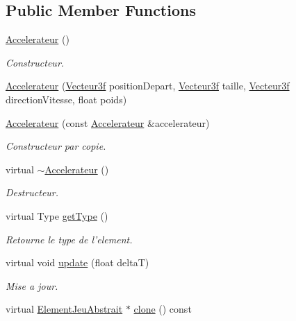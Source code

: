 \subsection*{Public Member Functions}
\begin{DoxyCompactItemize}
\item 
\hyperlink{group__inf2990_gaa9565cdb55e423b975ed39344f2c57a9}{Accelerateur} ()
\begin{DoxyCompactList}\small\item\em Constructeur. \end{DoxyCompactList}\item 
\hyperlink{group__inf2990_ga225372057b8bc81b0488af790df85fae}{Accelerateur} (\hyperlink{group__utilitaire_ga6b2956069f76c7e27df4f79f87e5a48c}{Vecteur3f} position\-Depart, \hyperlink{group__utilitaire_ga6b2956069f76c7e27df4f79f87e5a48c}{Vecteur3f} taille, \hyperlink{group__utilitaire_ga6b2956069f76c7e27df4f79f87e5a48c}{Vecteur3f} direction\-Vitesse, float poids)
\item 
\hyperlink{group__inf2990_gac826e93cf1b9d277f38ca09d52636a43}{Accelerateur} (const \hyperlink{class_accelerateur}{Accelerateur} \&accelerateur)
\begin{DoxyCompactList}\small\item\em Constructeur par copie. \end{DoxyCompactList}\item 
virtual \hyperlink{group__inf2990_ga3e17016992773f130a44cd9f70249e85}{$\sim$\-Accelerateur} ()
\begin{DoxyCompactList}\small\item\em Destructeur. \end{DoxyCompactList}\item 
virtual Type \hyperlink{group__inf2990_ga2ee3174059cff90eda7941e20699f2c8}{get\-Type} ()
\begin{DoxyCompactList}\small\item\em Retourne le type de l'element. \end{DoxyCompactList}\item 
virtual void \hyperlink{group__inf2990_ga5bfc1b71b8460b0d34667ab37e1881ff}{update} (float delta\-T)
\begin{DoxyCompactList}\small\item\em Mise a jour. \end{DoxyCompactList}\item 
\hypertarget{group__inf2990_ga56f704dcb76a319389d98488226e2b55}{virtual \hyperlink{class_element_jeu_abstrait}{Element\-Jeu\-Abstrait} $\ast$ \hyperlink{group__inf2990_ga56f704dcb76a319389d98488226e2b55}{clone} () const }\label{group__inf2990_ga56f704dcb76a319389d98488226e2b55}


\end{DoxyCompactItemize}
